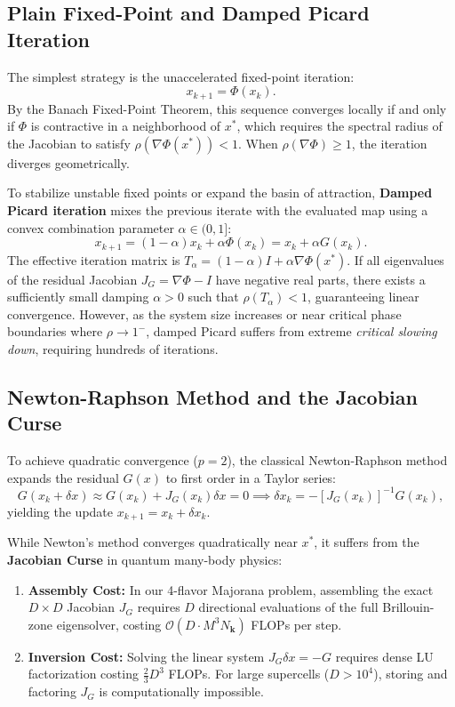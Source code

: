 \subsection{Plain Fixed-Point and Damped Picard Iteration}
The simplest strategy is the unaccelerated fixed-point iteration:
\begin{equation}
x_{k+1} = \Phi(x_k).
\end{equation}
By the Banach Fixed-Point Theorem, this sequence converges locally if and only if $\Phi$ is contractive in a neighborhood of $x^*$, which requires the spectral radius of the Jacobian to satisfy $\rho(\nabla \Phi(x^*)) < 1$. When $\rho(\nabla \Phi) \ge 1$, the iteration diverges geometrically.

To stabilize unstable fixed points or expand the basin of attraction, \textbf{Damped Picard iteration} mixes the previous iterate with the evaluated map using a convex combination parameter $\alpha \in (0, 1]$:
\begin{equation}
x_{k+1} = (1 - \alpha) x_k + \alpha \Phi(x_k) = x_k + \alpha G(x_k).
\end{equation}
The effective iteration matrix is $T_\alpha = (1 - \alpha) I + \alpha \nabla \Phi(x^*)$. If all eigenvalues of the residual Jacobian $J_G = \nabla \Phi - I$ have negative real parts, there exists a sufficiently small damping $\alpha > 0$ such that $\rho(T_\alpha) < 1$, guaranteeing linear convergence. However, as the system size increases or near critical phase boundaries where $\rho \to 1^-$, damped Picard suffers from extreme \textit{critical slowing down}, requiring hundreds of iterations.

\subsection{Newton-Raphson Method and the Jacobian Curse}
To achieve quadratic convergence ($p=2$), the classical Newton-Raphson method expands the residual $G(x)$ to first order in a Taylor series:
\begin{equation}
G(x_k + \delta x) \approx G(x_k) + J_G(x_k) \delta x = 0 \implies \delta x_k = - [J_G(x_k)]^{-1} G(x_k),
\end{equation}
yielding the update $x_{k+1} = x_k + \delta x_k$.

While Newton's method converges quadratically near $x^*$, it suffers from the \textbf{Jacobian Curse} in quantum many-body physics:
\begin{enumerate}
\item \textbf{Assembly Cost:} In our 4-flavor Majorana problem, assembling the exact $D \times D$ Jacobian $J_G$ requires $D$ directional evaluations of the full Brillouin-zone eigensolver, costing $\mathcal{O}(D \cdot M^3 N_{\mathbf{k}})$ FLOPs per step.
\item \textbf{Inversion Cost:} Solving the linear system $J_G \delta x = -G$ requires dense LU factorization costing $\frac{2}{3} D^3$ FLOPs. For large supercells ($D > 10^4$), storing and factoring $J_G$ is computationally impossible.
\end{enumerate}

